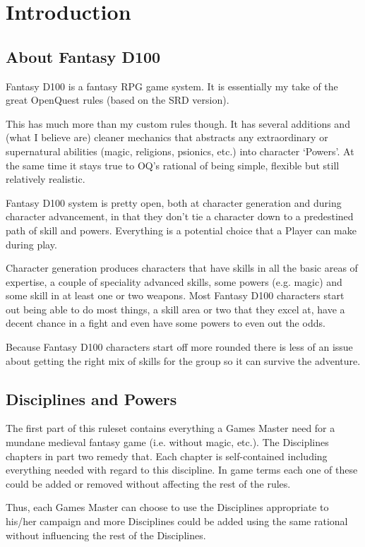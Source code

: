 \chapter{Introduction}
\label{ch:introduction}


\section{About Fantasy D100}

Fantasy D100 is a fantasy RPG game system. It is essentially my take of the great OpenQuest rules (based on the SRD version).

This has much more than my custom rules though. It has several additions and (what I believe are) cleaner mechanics that abstracts any extraordinary or supernatural abilities (magic, religions, psionics, etc.) into character `Powers'. At the same time it stays true to OQ's rational of being simple, flexible but still relatively realistic.

Fantasy D100 system is pretty open, both at character generation and during character advancement, in that they don’t tie a character down to a predestined path of skill and powers. Everything is a potential choice that a Player can make during play.

Character generation produces characters that have skills in all the basic areas of expertise, a couple of speciality advanced skills, some powers (e.g. magic) and some skill in at least one or two weapons. Most Fantasy D100 characters start out being able to do most things, a skill area or two that they excel at, have a decent chance in a fight and even have some powers to even out the odds.

Because Fantasy D100 characters start off more rounded there is less of an issue about getting the right mix of skills for the group so it can survive the adventure.

\section{Disciplines and Powers}
The first part of this ruleset contains everything a Games Master need for a mundane medieval fantasy game (i.e. without magic, etc.). The Disciplines chapters in part two remedy that. Each chapter is self-contained including everything needed with regard to this discipline. In game terms each one of these could be added or removed without affecting the rest of the rules. 

Thus, each Games Master can choose to use the Disciplines appropriate to his/her campaign and more Disciplines could be added using the same rational without influencing the rest of the Disciplines.

